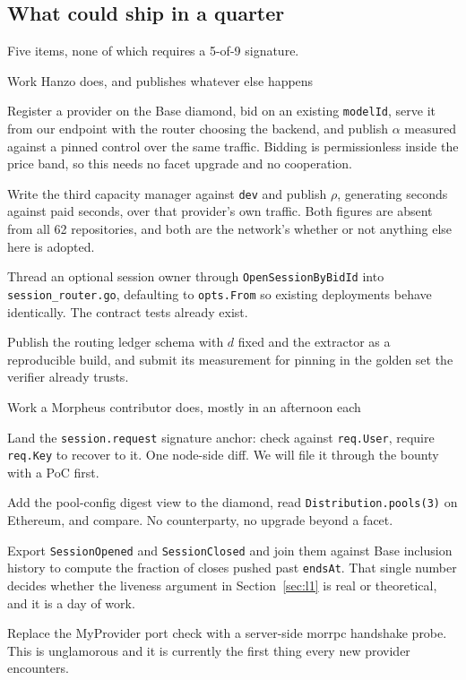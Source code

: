 \documentclass[11pt,a4paper]{article}
\newcommand{\code}[1]{\texttt{\small #1}}
\begin{document}
\subsection{What could ship in a quarter}

Five items, none of which requires a 5-of-9 signature.

\begin{stake}{Work Hanzo does, and publishes whatever else happens}
\item Register a provider on the Base diamond, bid on an existing
\code{modelId}, serve it from our endpoint with the router choosing the backend,
and publish $\alpha$ measured against a pinned control over the same traffic.
Bidding is permissionless inside the price band, so this needs no facet upgrade
and no cooperation.
\item Write the third capacity manager against \code{dev} and publish $\rho$,
generating seconds against paid seconds, over that provider's own traffic. Both
figures are absent from all 62 repositories, and both are the network's whether
or not anything else here is adopted.
\item Thread an optional session owner through \code{OpenSessionByBidId} into
\code{session\_router.go}, defaulting to \code{opts.From} so existing
deployments behave identically. The contract tests already exist.
\item Publish the routing ledger schema with $d$ fixed and the extractor as a
reproducible build, and submit its measurement for pinning in the golden set the
verifier already trusts.
\end{stake}

\begin{stake}{Work a Morpheus contributor does, mostly in an afternoon each}
\item Land the \code{session.request} signature anchor: check against
\code{req.User}, require \code{req.Key} to recover to it. One node-side diff. We
will file it through the bounty with a PoC first.
\item Add the pool-config digest view to the diamond, read
\code{Distribution.pools(3)} on Ethereum, and compare. No counterparty, no
upgrade beyond a facet.
\item Export \code{SessionOpened} and \code{SessionClosed} and join them against
Base inclusion history to compute the fraction of closes pushed past
\code{endsAt}. That single number decides whether the liveness argument in
Section~\ref{sec:l1} is real or theoretical, and it is a day of work.
\item Replace the MyProvider port check with a server-side morrpc handshake
probe. This is unglamorous and it is currently the first thing every new
provider encounters.
\end{stake}
\end{document}
